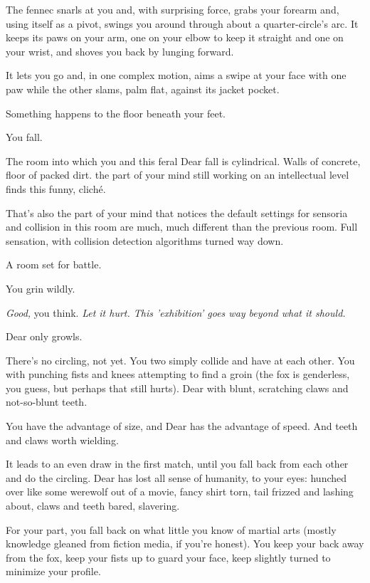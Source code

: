 The fennec snarls at you and, with surprising force, grabs your forearm and, using itself as a pivot, swings you around through about a quarter-circle's arc. It keeps its paws on your arm, one on your elbow to keep it straight and one on your wrist, and shoves you back by lunging forward.

It lets you go and, in one complex motion, aims a swipe at your face with one paw while the other slams, palm flat, against its jacket pocket.

Something happens to the floor beneath your feet.

You fall.


The room into which you and this feral Dear fall is cylindrical. Walls of concrete, floor of packed dirt. the part of your mind still working on an intellectual level finds this funny, cliché.

That's also the part of your mind that notices the default settings for sensoria and collision in this room are much, much different than the previous room. Full sensation, with collision detection algorithms turned way down.

A room set for battle.

You grin wildly.

\emph{Good,} you think. \emph{Let it hurt. This 'exhibition' goes way beyond what it should.}

Dear only growls.

There's no circling, not yet. You two simply collide and have at each other. You with punching fists and knees attempting to find a groin (the fox is genderless, you guess, but perhaps that still hurts). Dear with blunt, scratching claws and not-so-blunt teeth.

You have the advantage of size, and Dear has the advantage of speed. And teeth and claws worth wielding.

It leads to an even draw in the first match, until you fall back from each other and do the circling. Dear has lost all sense of humanity, to your eyes: hunched over like some werewolf out of a movie, fancy shirt torn, tail frizzed and lashing about, claws and teeth bared, slavering.

For your part, you fall back on what little you know of martial arts (mostly knowledge gleaned from fiction media, if you're honest). You keep your back away from the fox, keep your fists up to guard your face, keep slightly turned to minimize your profile.

